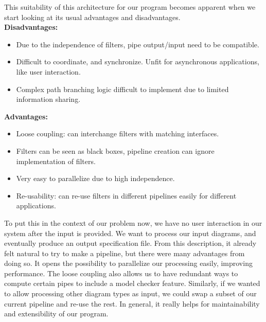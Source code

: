 \documentclass[11pt]{article}
\begin{document}
    This suitability of this architecture for our program becomes apparent when we start looking at its usual advantages and disadvantages.\\
    \textbf{Disadvantages:}
    \begin{itemize}
        \item Due to the independence of filters, pipe output/input need to be compatible.
        \item Difficult to coordinate, and synchronize. Unfit for asynchronous applications, like user interaction.
        \item Complex path branching logic difficult to implement due to limited information sharing.
    \end{itemize}
    \textbf{Advantages:}
    \begin{itemize}
        \item Loose coupling: can interchange filters with matching interfaces.
        \item Filters can be seen as black boxes, pipeline creation can ignore implementation of filters.
        \item Very easy to parallelize due to high independence.
        \item Re-usability: can re-use filters in different pipelines easily for different applications.
    \end{itemize}
    To put this in the context of our problem now, we have no user interaction in our system after the input is provided. We want to process our input diagrams, and eventually produce an output specification file. From this description, it already felt natural to try to make a pipeline, but there were many advantages from doing so. It opens the possibility to parallelize our processing easily, improving performance. The loose coupling also allows us to have redundant ways to compute certain pipes to include a model checker feature. Similarly, if we wanted to allow processing other diagram types as input, we could swap a subset of our current pipeline and re-use the rest. In general, it really helps for maintainability and extensibility of our program.
\end{document}
